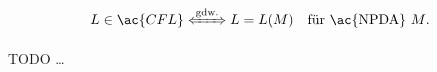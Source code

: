 \begin{Satz}\label{satz:5.1}
	\[
		L \in \ac{CFL} \xLeftrightarrow{\text{gdw.}}
		L =L(M) \quad\text{für \ac{NPDA} $M$.}
	\]
\end{Satz}
TODO \ldots
